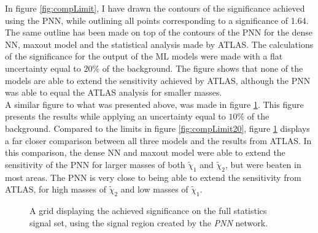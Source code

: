 In figure \ref{fig:compLimit}, I have drawn the contours of the significance achieved using the \ac{PNN},
while outlining all points corresponding to a significance of 1.64. The same outline has been made on top of the 
contours of the \ac{PNN} for the dense \ac{NN}, maxout model and the statistical analysis made by ATLAS. The calculations
of the significance for the output of the \ac{ML} models were made with a flat uncertainty equal to $20\%$ of the background.
The figure shows that none of the models are able to extend the sensitivity achieved by ATLAS, although the \ac{PNN} was able to equal
the ATLAS analysis for smaller masses.
\\
A similar figure to what was presented above, was made in figure \ref{fig:compLimit10}. This figure presents the results while applying an
uncertainty equal to $10\%$ of the background. Compared to the limits in figure \ref{fig:compLimit20}, figure \ref{fig:compLimit10} displays 
a far closer comparison between all three models and the results from ATLAS. In this comparison, the dense \ac{NN} and maxout model were able 
to extend the sensitivity of the \ac{PNN} for larger masses of both $\tilde{\chi}_1$ and $\tilde{\chi}_2$, but were beaten in most areas. The 
\ac{PNN} is very close to being able to extend the sensitivity from ATLAS, for high masses of $\tilde{\chi}_2$ and low masses of $\tilde{\chi}_1$. 
\begin{figure}
    \caption{A grid displaying the achieved significance on the full statistics signal set, using the signal region 
    created by the \emph{PNN} network.}
    \label{fig:compLimit10}
\end{figure}